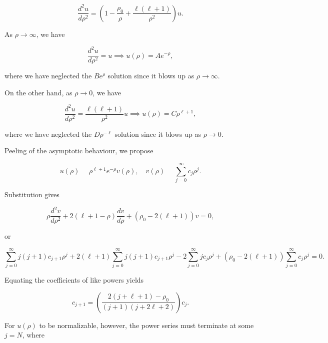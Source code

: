 \documentclass[a4paper,12pt]{report}
\begin{document}
\begin{equation}
  \frac{d^2u}{d\rho ^2} = \left( 1- \frac{\rho _{0} }{\rho } + \frac{\ell (\ell +1)}{\rho ^2}   \right) u.
\end{equation}

As \(\rho \to \infty\), we have 

\begin{equation}
  \frac{d^2u}{d\rho ^2} = u \implies u(\rho ) = Ae^{-\rho },   
\end{equation}

where we have neglected the \(Be^{\rho } \) solution since it blows up as \(\rho \to \infty\). 

On the other hand, as \(\rho \to 0\), we have 

\begin{equation}
  \frac{d^2u}{d\rho ^2} = \frac{\ell (\ell +1)}{\rho ^2} u \implies u(\rho ) = C \rho ^{\ell +1},  
\end{equation}

where we have neglected the \(D\rho ^{-\ell } \) solution since it blows up as \(\rho \to 0\).  

Peeling of the asymptotic behaviour, we propose

\begin{equation}
  u(\rho ) = \rho ^{\ell +1}e^{-\rho }v(\rho ), \quad v(\rho ) = \sum_{j=0}^{\infty} c_{j}\rho ^{j}.   
\end{equation}

Substitution gives 

\begin{equation}
  \rho \frac{d^2v}{d\rho ^2} + 2(\ell +1-\rho ) \frac{dv}{d\rho } + (\rho _{0} - 2(\ell +1) )v = 0,
\end{equation}

or 

\begin{equation}
  \sum_{j=0}^{\infty} j(j+1)c_{j+1}\rho ^{j} + 2(\ell +1)\sum_{j=0}^{\infty} j(j+1)c_{j+1}\rho ^{j} - 2\sum_{j=0}^{\infty} j c_{j}\rho ^{j} + (\rho _{0} - 2(\ell +1) ) \sum_{j=0}^{\infty}c_{j}\rho ^{j} = 0.
\end{equation}

Equating the coefficients of like powers yields 

\begin{equation}
  c_{j+1} = \left( \frac{2(j+\ell +1)-\rho _{0} }{(j+1)(j+2\ell +2)}  \right) c_{j}. 
\end{equation}

For \(u(\rho )\) to be normalizable, however, the power series must terminate at some \(j=N\), where 
\end{document}

